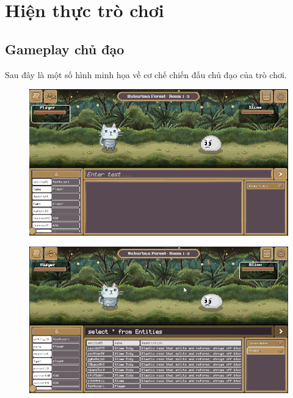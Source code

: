 \section{Hiện thực trò chơi}
\subsection{Gameplay chủ đạo}
Sau đây là một số hình minh họa về cơ chế chiến đấu chủ đạo của trò chơi.
\begin{figure}[H]
	\centering
	\includegraphics[width=13cm]{Images/gameplay1.png}
	\vspace{0.5cm}
	\caption{}
\end{figure}

\begin{figure}[H]
	\centering
	\includegraphics[width=13cm]{Images/gameplay2.png}
	\vspace{0.5cm}
	\caption{}
\end{figure}

